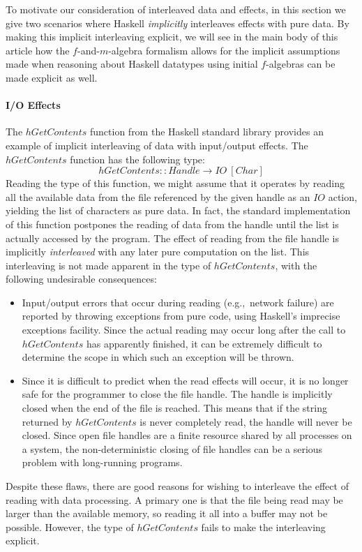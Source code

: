 \documentclass{jfp1}
\begin{document}
To motivate our consideration of interleaved data and effects, in this
section we give two scenarios where Haskell \emph{implicitly}
interleaves effects with pure data. By making this implicit
interleaving explicit, we will see in the main body of this article
how the $f$-and-$m$-algebra formalism allows for the implicit
assumptions made when reasoning about Haskell datatypes using initial
$f$-algebras can be made explicit as well.

\paragraph{I/O Effects}

The $\mathit{hGetContents}$ function from the Haskell standard library
provides an example of implicit interleaving of data with input/output
effects. The $\mathit{hGetContents}$ function has the following type:
\begin{displaymath}
  \mathit{hGetContents} :: \mathit{Handle} \to \mathit{IO}~[\mathit{Char}]
\end{displaymath}
Reading the type of this function, we might assume that it operates by
reading all the available data from the file referenced by the given
handle as an $\mathit{IO}$ action, yielding the list of characters as
pure data. In fact, the standard implementation of this function
postpones the reading of data from the handle until the list is
actually accessed by the program. The effect of reading from the file
handle is implicitly \emph{interleaved} with any later pure
computation on the list. This interleaving is not made apparent in the
type of $\mathit{hGetContents}$, with the following undesirable
consequences:
\begin{itemize}
\item Input/output errors that occur during reading (e.g.,~network
  failure) are reported by throwing exceptions from pure code, using
  Haskell's imprecise exceptions facility. Since the actual reading
  may occur long after the call to $\mathit{hGetContents}$ has
  apparently finished, it can be extremely difficult to determine the
  scope in which such an exception will be thrown.
\item Since it is difficult to predict when the read effects will
  occur, it is no longer safe for the programmer to close the file
  handle. The handle is implicitly closed when the end of the file is
  reached. This means that if the string returned by
  $\mathit{hGetContents}$ is never completely read, the handle will
  never be closed. Since open file handles are a finite resource
  shared by all processes on a system, the non-deterministic closing
  of file handles can be a serious problem with long-running programs.
\end{itemize}
Despite these flaws, there are good reasons for wishing to interleave
the effect of reading with data processing. A primary one is that the
file being read may be larger than the available memory, so reading it
all into a buffer may not be possible. However, the type of
$\mathit{hGetContents}$ fails to make the interleaving explicit.
\end{document}
